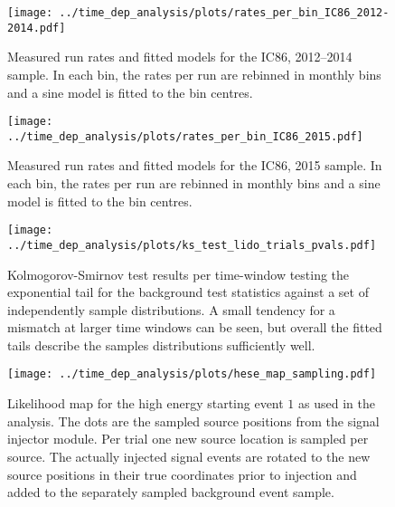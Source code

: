 \begin{figure}[H]
  \centering
  \texttt{[image: ../time\_dep\_analysis/plots/rates\_per\_bin\_IC86\_2012-2014.pdf]}
  \caption[Rate models per bin for sample IC79]{
    Measured run rates and fitted models for the IC86, 2012--2014 sample.
    In each bin, the rates per run are rebinned in monthly bins and a sine model is fitted to the bin centres.
  }
  \label{fig:rates_per_bin_IC86_2012-2014}
\end{figure}

\begin{figure}[H]
  \centering
  \texttt{[image: ../time\_dep\_analysis/plots/rates\_per\_bin\_IC86\_2015.pdf]}
  \caption[Rate models per bin for sample IC79]{
    Measured run rates and fitted models for the IC86, 2015 sample.
    In each bin, the rates per run are rebinned in monthly bins and a sine model is fitted to the bin centres.
  }
  \label{fig:rates_per_bin_IC86_2015}
\end{figure}

\begin{figure}[H]
  \centering
  \texttt{[image: ../time\_dep\_analysis/plots/ks\_test\_lido\_trials\_pvals.pdf]}
  \caption[KS test using independent trials for the time-dependent BG TSs]{
    Kolmogorov-Smirnov test results per time-window testing the exponential tail for the background test statistics against a set of independently sample distributions.
    A small tendency for a mismatch at larger time windows can be seen, but overall the fitted tails describe the samples distributions sufficiently well.
  }
  \label{fig:ks_test_lido_trials_pvals}
\end{figure}

\begin{figure}[H]
  \centering
  \texttt{[image: ../time\_dep\_analysis/plots/hese\_map\_sampling.pdf]}
  \caption[Sampling from a healpy map for the signal source injection]{
    Likelihood map for the high energy starting event $1$ as used in the analysis.
    The dots are the sampled source positions from the signal injector module.
    Per trial one new source location is sampled per source.
    The actually injected signal events are rotated to the new source positions in their true coordinates prior to injection and added to the separately sampled background event sample.
  }
  \label{fig:hese_map_sampling}
\end{figure}

